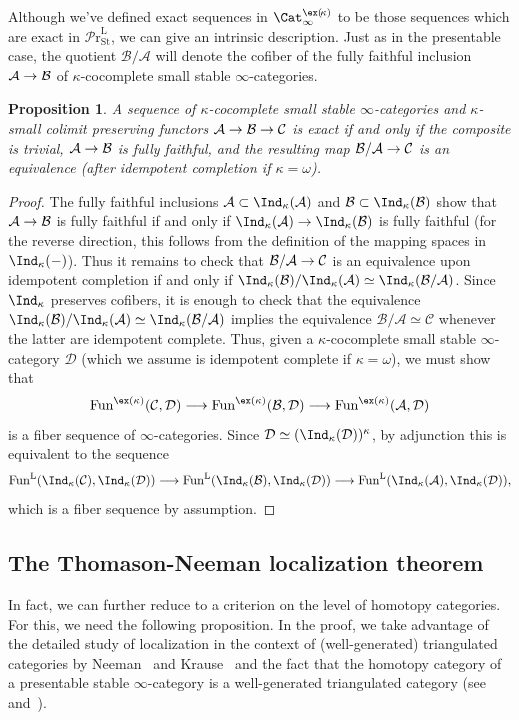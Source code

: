 \documentclass{amsart}
\renewcommand{\to}{\mathchoice{\longrightarrow}{\rightarrow}{\rightarrow}{\rightarrow}}
\let\catsymbfont\mathcal
\newcommand{\aA}{{\catsymbfont{A}}}
\newcommand{\aB}{{\catsymbfont{B}}}
\newcommand{\aC}{{\catsymbfont{C}}}
\newcommand{\aD}{{\catsymbfont{D}}}
\renewcommand{\L}{\mathrm{L}}
\newcommand{\kstabcat}{\Cat_\i^{\ex(\!\kappa)}}
\newcommand{\stabprcat}{{{\mathcal{P}\mathrm{r}}^{\mathrm{L}}_\mathrm{St}}}
\newcommand{\Fun}{\mathrm{Fun}} %
\renewcommand{\i}{\infty}
\numberwithin{equation}{section}
\newtheorem{proposition}[equation]{Proposition}
\theoremstyle{definition}
\begin{document}
Although we've defined exact sequences in $\kstabcat$ to be those
sequences which are exact in $\stabprcat$, we can give an intrinsic 
description.  Just as in the presentable case, the quotient $\aB/\aA$
will denote the cofiber of the fully faithful inclusion $\aA\to\aB$
of $\kappa$-cocomplete small stable $\i$-categories.

\begin{proposition}\label{prop:exact}
A sequence of $\kappa$-cocomplete small stable $\i$-categories and
$\kappa$-small colimit preserving functors $\aA \to \aB \to \aC$ is
exact if and only if the composite is trivial, $\aA\to\aB$ is fully
faithful, and the resulting map $\aB/\aA\to\aC$ is an equivalence
(after idempotent completion if $\kappa=\omega$).
\end{proposition}

\begin{proof}
The fully faithful inclusions $\aA\subset\Ind_\kappa(\aA)$ and
$\aB\subset\Ind_\kappa(\aB)$ show that $\aA\to\aB$ is fully faithful
if and only if $\Ind_\kappa(\aA)\to\Ind_\kappa(\aB)$ is fully faithful
(for the reverse direction, this follows from the definition of the
mapping spaces in $\Ind_{\kappa}(-)$).  Thus it remains to check that
$\aB/\aA\to\aC$ is an equivalence upon idempotent completion if and
only if
$\Ind_\kappa(\aB)/\Ind_\kappa(\aA)\simeq\Ind_\kappa(\aB/\aA)$. Since
$\Ind_\kappa$ preserves cofibers, it is enough to check that the
equivalence
$\Ind_\kappa(\aB)/\Ind_\kappa(\aA)\simeq\Ind_\kappa(\aB/\aA)$ implies
the equivalence $\aB/\aA\simeq\aC$ whenever the latter are idempotent
complete.  Thus, given a $\kappa$-cocomplete small stable
$\i$-category $\aD$ (which we assume is idempotent complete if
$\kappa=\omega$), we must show that 
\[
\Fun^{\ex(\kappa)}(\aC,\aD)\to\Fun^{\ex(\kappa)}(\aB,\aD)\to\Fun^{\ex(\kappa)}(\aA,\aD)
\]
is a fiber sequence of $\i$-categories.
Since $\aD\simeq(\Ind_\kappa(\aD))^\kappa$, by adjunction this is
equivalent to the sequence 
\[
\Fun^{\L}(\Ind_\kappa(\aC),\Ind_\kappa(\aD))\to\Fun^{\L}(\Ind_\kappa(\aB),\Ind_\kappa(\aD))\to\Fun^{\L}(\Ind_\kappa(\aA),\Ind_\kappa(\aD)),
\]
which is a fiber sequence by assumption.
\end{proof}

\subsection{The Thomason-Neeman localization theorem}
In fact, we can further reduce to a criterion on the level of homotopy
categories.  For this, we need the following proposition.  In the
proof, we take advantage of the detailed study of localization in the
context of (well-generated) triangulated categories by
Neeman~\cite{Neeman, NeemanLoc} and Krause~\cite{Krausenotes} and the
fact that the homotopy category of a presentable stable $\i$-category
is a well-generated triangulated category (see~\cite[1.4.5.2]{HAG}
and~\cite{Krausewell}).
\end{document}

